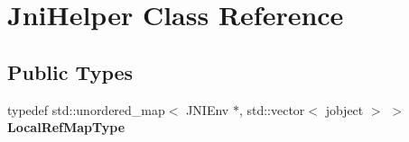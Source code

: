 \hypertarget{classJniHelper}{}\section{Jni\+Helper Class Reference}
\label{classJniHelper}
\subsection*{Public Types}
\begin{DoxyCompactItemize}
\item 
\mbox{\label{classJniHelper_aa8a736d6ef6f0cd33dfacb7908326ed4}} 
typedef std\+::unordered\+\_\+map$<$ J\+N\+I\+Env $\ast$, std\+::vector$<$ jobject $>$ $>$ {\bfseries Local\+Ref\+Map\+Type}
\end{DoxyCompactItemize}
